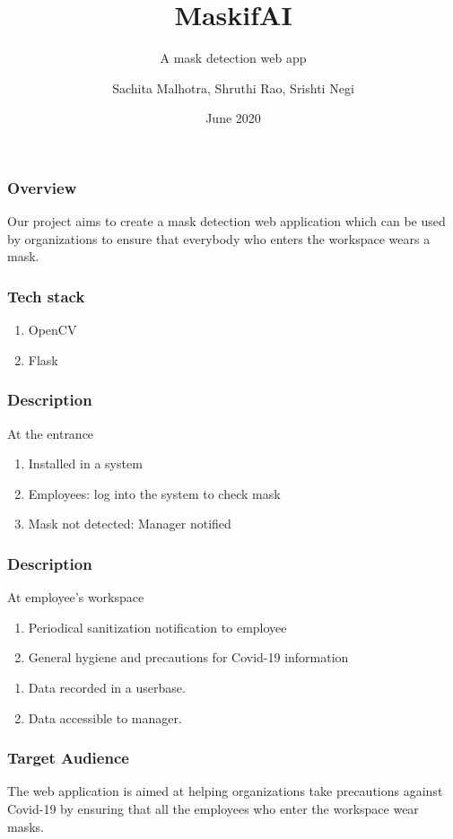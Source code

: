 \documentclass[14pt]{beamer}
\title{MaskifAI}
\subtitle{A mask detection web app}
\author[TEAM 6]{Sachita Malhotra, Shruthi Rao, Srishti Negi}
\date{June 2020}
\begin{document}
\begin{frame}
    \titlepage
\end{frame}

\begin{frame}
    \frametitle{Overview}
    Our project aims to create a mask detection web application which can be used by organizations to ensure that everybody who enters the workspace wears a mask.
\end{frame}

\begin{frame}
    \frametitle{Tech stack}
    \begin{enumerate}
        \item OpenCV
        \item Flask
    \end{enumerate}
\end{frame} 

\begin{frame}
    \frametitle{Description}
    At the entrance
    \begin{enumerate}
        \item Installed in a system

        \item Employees: log into the system to check mask

        \item Mask not detected: Manager notified
    \end{enumerate}
\end{frame}

\begin{frame}
    \frametitle{Description}
    At employee's workspace
    \begin{enumerate}
        \item Periodical sanitization notification to employee
            
        \item General hygiene and precautions for Covid-19 information
    \end{enumerate}   
    \begin{enumerate}
        \item Data recorded in a userbase.
        
        \item Data accessible to manager.
    \end{enumerate}
\end{frame}

\begin{frame}
    \frametitle{Target Audience}
    The web application is  aimed at helping organizations take precautions against Covid-19 by ensuring that all the employees who enter the workspace wear masks.
\end{frame}
\end{document}
